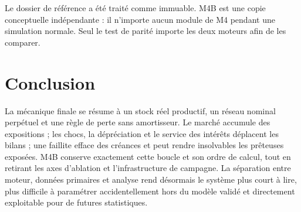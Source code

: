 \documentclass[11pt,a4paper]{article}
\begin{document}
Le dossier de référence a été traité comme immuable. M4B est une copie
conceptuelle indépendante : il n'importe aucun module de M4 pendant une
simulation normale. Seul le test de parité importe les deux moteurs afin de
les comparer.

\section*{Conclusion}

La mécanique finale se résume à un stock réel productif, un réseau nominal
perpétuel et une règle de perte sans amortisseur. Le marché accumule des
expositions ; les chocs, la dépréciation et le service des intérêts déplacent
les bilans ; une faillite efface des créances et peut rendre insolvables les
prêteuses exposées. M4B conserve exactement cette boucle et son ordre de
calcul, tout en retirant les axes d'ablation et l'infrastructure de campagne.
La séparation entre moteur, données primaires et analyse rend désormais le
système plus court à lire, plus difficile à paramétrer accidentellement hors
du modèle validé et directement exploitable pour de futures statistiques.
\end{document}

